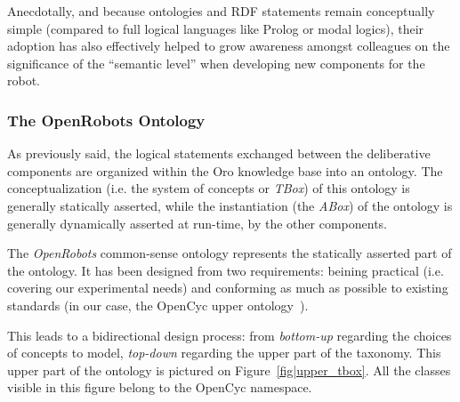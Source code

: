 \documentclass[preprint,3p,times]{elsarticle}
\newcommand{\ie}{i.e.\xspace}
\begin{document}
Anecdotally, and because ontologies and RDF statements remain conceptually
simple (compared to full logical languages like {\sc Prolog} or modal logics),
their adoption has also effectively helped to grow awareness amongst colleagues
on the significance of the ``semantic level'' when developing new components
for the robot.

\subsubsection{The OpenRobots Ontology}

As previously said, the logical statements exchanged between the deliberative
components are organized within the {\sc Oro} knowledge base into an ontology.
The conceptualization (\ie the system of concepts or \emph{TBox}) of this
ontology is generally statically asserted, while the instantiation (the
\emph{ABox}) of the ontology is generally dynamically asserted at run-time, by
the other components.

The \emph{OpenRobots} common-sense ontology represents the statically asserted
part of the ontology. It has been designed from two requirements: beining
practical (\ie covering our experimental needs) and conforming as much as
possible to existing standards (in our case, the {\sc OpenCyc} upper
ontology~\cite{lenat1990cyc}).

This leads to a bidirectional design process: from \emph{bottom-up} regarding
the choices of concepts to model, \emph{top-down} regarding the upper part of
the taxonomy. This upper part of the ontology is pictured on
Figure~\ref{fig|upper_tbox}. All the classes visible in this figure belong to
the {\sc OpenCyc} namespace.
\end{document}
